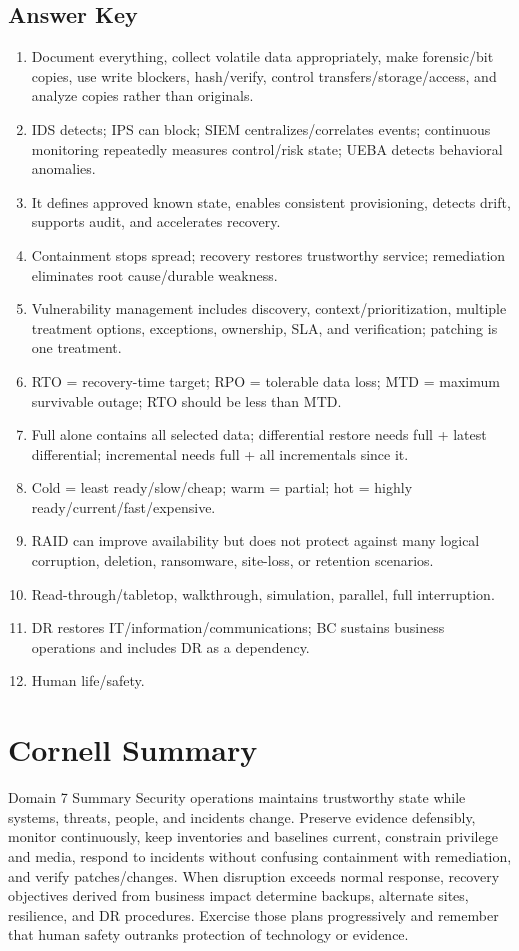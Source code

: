 \documentclass[10pt,letterpaper]{article}
\begin{document}
\subsection*{\color{teal}Answer Key}
\begin{enumerate}
\item Document everything, collect volatile data appropriately, make forensic/bit copies, use write blockers, hash/verify, control transfers/storage/access, and analyze copies rather than originals.
\item IDS detects; IPS can block; SIEM centralizes/correlates events; continuous monitoring repeatedly measures control/risk state; UEBA detects behavioral anomalies.
\item It defines approved known state, enables consistent provisioning, detects drift, supports audit, and accelerates recovery.
\item Containment stops spread; recovery restores trustworthy service; remediation eliminates root cause/durable weakness.
\item Vulnerability management includes discovery, context/prioritization, multiple treatment options, exceptions, ownership, SLA, and verification; patching is one treatment.
\item RTO = recovery-time target; RPO = tolerable data loss; MTD = maximum survivable outage; RTO should be less than MTD.
\item Full alone contains all selected data; differential restore needs full + latest differential; incremental needs full + all incrementals since it.
\item Cold = least ready/slow/cheap; warm = partial; hot = highly ready/current/fast/expensive.
\item RAID can improve availability but does not protect against many logical corruption, deletion, ransomware, site-loss, or retention scenarios.
\item Read-through/tabletop, walkthrough, simulation, parallel, full interruption.
\item DR restores IT/information/communications; BC sustains business operations and includes DR as a dependency.
\item Human life/safety.
\end{enumerate}

\section{\color{navy}Cornell Summary}
\begin{summarybox}{Domain 7 Summary}
Security operations maintains trustworthy state while systems, threats, people, and incidents change. Preserve evidence defensibly, monitor continuously, keep inventories and baselines current, constrain privilege and media, respond to incidents without confusing containment with remediation, and verify patches/changes. When disruption exceeds normal response, recovery objectives derived from business impact determine backups, alternate sites, resilience, and DR procedures. Exercise those plans progressively and remember that human safety outranks protection of technology or evidence.
\end{summarybox}
\end{document}
